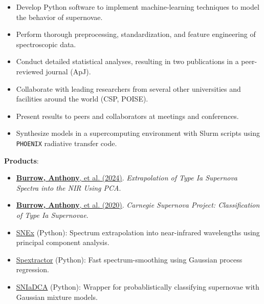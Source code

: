 \documentclass[letterpaper,11pt]{article}
\newcommand{\smallHeading}[1]{\small{\textbf{#1}:\vspace{-5pt}}}
\newcommand{\paperEntryShort}[4]{
  \href{https://doi.org/#1}{\textbf{Burrow, Anthony}, et al. (#2)}.
  \textit{#3}. #4
}
\newcommand{\emphasize}[1]{#1}
\begin{document}
    \begin{itemize}\small
      \item \emphasize{Develop Python software} to implement
        \emphasize{machine-learning} techniques to \emphasize{model} the
        behavior of supernovae.
      \item Perform thorough \emphasize{preprocessing},
        \emphasize{standardization}, and \emphasize{feature engineering} of
        spectroscopic data.
      \item Conduct detailed \emphasize{statistical analyses}, resulting in two
        \emphasize{publications} in a peer-reviewed journal (ApJ).
      \item \emphasize{Collaborate} with leading researchers from several other
        universities and facilities around the world (CSP, POISE).
      \item \emphasize{Present} results to peers and collaborators at meetings
        and conferences.
      \item \emphasize{Synthesize models} in a \emphasize{supercomputing}
        environment with \emphasize{Slurm} scripts using \texttt{PHOENIX}
        radiative transfer code.
    \end{itemize}
    \hspace*{1.1em}\smallHeading{Products}
    \begin{itemize}\small
      \item \paperEntryShort{10.3847/1538-4357/ad3c45}{2024}
            {Extrapolation of Type Ia Supernova Spectra into the NIR Using PCA}
            {\apj}
      \item \paperEntryShort{10.3847/1538-4357/abafa2}{2020}
            {Carnegie Supernova Project: Classification of Type Ia Supernovae}
            {\apj}
      \item \href{https://github.com/anthonyburrow/SNEx}{SNEx} (Python):
        Spectrum \emphasize{extrapolation} into near-infrared wavelengths using
        \emphasize{principal component analysis}.
      \item \href{https://github.com/anthonyburrow/spextractor}{Spextractor} (Python):
        Fast spectrum-smoothing using \emphasize{Gaussian process regression}.
      \item \href{https://github.com/anthonyburrow/SNIaDCA}{SNIaDCA} (Python):
        Wrapper for probablistically \emphasize{classifying} supernovae with
        \emphasize{Gaussian mixture models}.
    \end{itemize}\vspace{-5pt}
\end{document}
